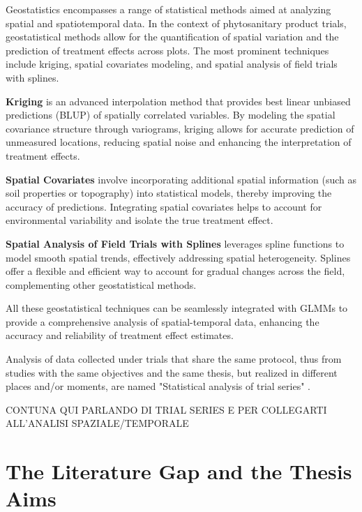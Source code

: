 \documentclass[12pt,a4paper,oneside]{report}
\begin{document}
Geostatistics encompasses a range of statistical methods aimed at analyzing
spatial and spatiotemporal data. In the context of phytosanitary product trials,
geostatistical methods allow for the quantification of spatial variation and the
prediction of treatment effects across plots. The most prominent techniques
include kriging, spatial covariates modeling, and spatial analysis of field trials
with splines.

\textbf{Kriging} is an advanced interpolation method that provides best linear
unbiased predictions (BLUP) of spatially correlated variables. By modeling the
spatial covariance structure through variograms, kriging allows for accurate
prediction of unmeasured locations, reducing spatial noise and enhancing the
interpretation of treatment effects.

\textbf{Spatial Covariates} involve incorporating additional spatial information
(such as soil properties or topography) into statistical models, thereby
improving the accuracy of predictions. Integrating spatial covariates helps to
account for environmental variability and isolate the true treatment effect.

\textbf{Spatial Analysis of Field Trials with Splines} leverages spline functions
to model smooth spatial trends, effectively addressing spatial heterogeneity.
Splines offer a flexible and efficient way to account for gradual changes across
the field, complementing other geostatistical methods.

All these geostatistical techniques can be seamlessly integrated with GLMMs to
provide a comprehensive analysis of spatial-temporal data, enhancing the accuracy and
reliability of treatment effect estimates.

Analysis of data collected under trials that share the same protocol, thus
from studies with the same objectives and the same thesis,
but realized in different places and/or moments, 
are named "Statistical analysis of trial series" \cite{EPPO_PP1_152}.

CONTUNA QUI PARLANDO DI TRIAL SERIES E PER COLLEGARTI ALL'ANALISI SPAZIALE/TEMPORALE

\section{The Literature Gap and the Thesis Aims}
\end{document}
